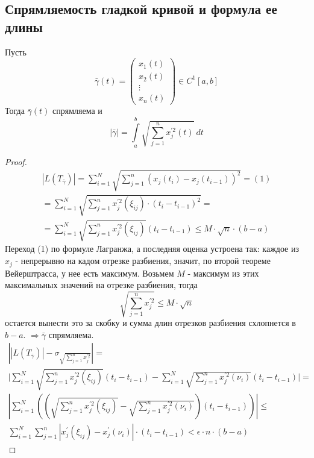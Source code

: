 \subsection{Спрямляемость гладкой кривой и формула ее длины}
\begin{theorem}
    Пусть 
    \[\bar{\gamma}(t) = 
    \begin{pmatrix}
    x_1(t)\\
    x_2(t)\\
    \vdots\\
    x_n(t)
    \end{pmatrix} \in C^1[a,b]\]
    Тогда $\bar{\gamma}(t)$ спрямляема и
    \[|\bar{\gamma}| = \int\limits_{a}^{b} \sqrt{\sum_{j = 1}^{n} x_j^{'2}(t)}\ dt\]
\end{theorem}
\begin{proof}
    \begin{multline*}
        |L(T_{\bar{\gamma}})| = \sum_{i = 1}^{N} \sqrt{ \sum_{j = 1}^{n}(x_j(t_i) - x_j(t_{i - 1}))^2} = (1)\\
        = \sum_{i = 1}^{N} \sqrt{\sum_{j = 1}^{n} x_j^{'2}(\xi_{ij}) \cdot (t_i - t_{i - 1})^2} =\\
        = \sum_{i = 1}^{N} \sqrt{\sum_{j = 1}^{n} x_j^{'2} (\xi_{ij})} (t_i - t_{i - 1}) \leqslant M \cdot \sqrt{n} \cdot (b - a)
    \end{multline*}
    Переход (1) по формуле Лагранжа, а последняя оценка устроена так: каждое из $x_j$ - непрерывно на кадом отрезке разбиения, значит, по второй теореме Вейерштрасса, у нее есть максимум. Возьмем $M$ - максимум из этих максимальных значений на отрезке разбиения, тогда 
    \[\sqrt{\sum\limits_{j=1}^{n}x_j^{'2}}\leq M\cdot \sqrt{n}\]
    остается вынести это за скобку и сумма длин отрезков разбиения схлопнется в $b-a$.
    $\Rightarrow \bar{\gamma}$ спрямляема.
    \newpage
    \begin{multline*}
        \left| |L(T_{\bar{\gamma}})| - \sigma_{\sqrt{\sum_{j = 1}^{n} x_j^{'2}}} \right| =\\
        \Bigg| \sum_{i = 1}^{N} \sqrt{\sum_{j = 1}^{n} x_j^{'2} (\xi_{ij})}(t_i - t_{i - 1}) - \sum_{i = 1}^{N} \sqrt{\sum_{j = 1}^{n} x_j^{'2} (\nu_{i})}(t_i - t_{i - 1}) \Bigg| =\\ 
        \left| \sum_{i=1}^{N} \left( \left( \sqrt{\sum_{j = 1}^{n} x_j^{'2} (\xi_{ij})} - \sqrt{\sum_{j = 1}^{n} x_j^{'2} (\nu_{i})}  \right) (t_i - t_{i - 1}) \right) \right| \leqslant\\
        \sum_{i = 1}^{N} \sum_{j = 1}^{n} |x_j^{'} (\xi_{ij}) - x_j^{'} (\nu_i)| \cdot (t_i - t_{i - 1}) < \epsilon \cdot n \cdot (b - a)

\end{multline*}
\end{proof}
